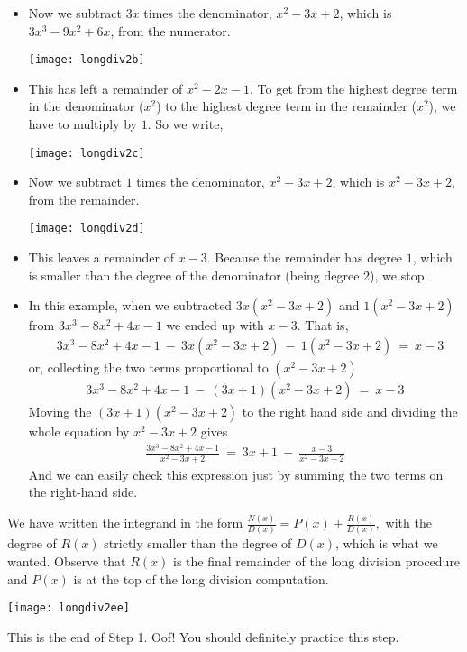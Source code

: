 \begin{eg}
\begin{itemize}
\begin{itemize}
\item Now we subtract $3x$ times the denominator, $x^2-3x+2$, which is $3x^3-9x^2+6x$,
from the numerator.
\begin{center}
\texttt{[image: longdiv2b]}
\end{center}
\item This has left a remainder of $x^2-2x-1$. To get from the
highest degree term in the denominator ($x^2$) to the highest degree term
in the remainder ($x^2$), we have to multiply by $1$. So we write,
\begin{center}
\texttt{[image: longdiv2c]}
\end{center}


\item Now we subtract $1$ times the denominator, $x^2-3x+2$, which is
$x^2-3x+2$, from the remainder.
\begin{center}
\texttt{[image: longdiv2d]}
\end{center}
\item This leaves a remainder of $x-3$. Because the remainder has degree $1$,
which is smaller than the degree of the denominator (being degree 2), we
stop.

\item In this example, when we subtracted $3x(x^2-3x+2)$ and
$1(x^2-3x+2)$ from $3x^3-8x^2+4x-1$ we ended up with
$x-3$. That is,
\begin{align*}
&3x^3-8x^2+4x-1
\ -\ 3x(x^2-3x+2)
\ -\ 1(x^2-3x+2)
\ =\ x-3
\end{align*}
or, collecting the two terms proportional to $(x^2-3x+2)$
\begin{align*}
3x^3-8x^2+4x-1
\ -\ (3x+1)(x^2-3x+2)
\ =\ x-3
\end{align*}
Moving the $(3x+1)(x^2-3x+2)$ to the right hand side and dividing the
whole equation by $x^2-3x+2$ gives
\begin{align*}
\frac{3x^3-8x^2+4x-1}{x^2-3x+2}
\ =\ 3x+1\ +\ \frac{x-3}{x^2-3x+2}
\end{align*}
And we can easily check this expression just by summing the two terms on the right-hand
side.
\end{itemize}
We have written the integrand in the form $\frac{N(x)}{D(x)}=P(x)+\frac{R(x)}{D(x)},$
with the degree of $R(x)$ strictly smaller than the degree of $D(x)$, which is what we
wanted. Observe  that $R(x)$ is the final remainder of the long division procedure
and $P(x)$ is at the top of the long division computation.
\begin{center}
\texttt{[image: longdiv2ee]}
\end{center}
This is the end of Step 1. Oof! You should definitely practice this step.


\end{itemize}
\end{eg}
